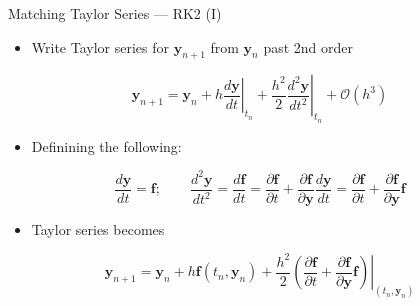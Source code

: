 \documentclass[serif]{beamer}
\begin{document}
\begin{frame}{Matching Taylor Series --- RK2 (I)}
  \begin{itemize}
  \item<1-> Write Taylor series for $\mathbf{y}_{n+1}$ from $\mathbf{y}_n$ past 2nd order
  \end{itemize}
  \begin{equation}
    \nonumber
    \mathbf{y}_{n+1} = \mathbf{y}_n + h\left.\frac{d\mathbf{y}}{dt}\right|_{t_n} + \frac{h^2}{2}\left.\frac{d^2\mathbf{y}}{dt^2}\right|_{t_n} + \mathcal{O}\left(h^3\right)
  \end{equation}
  \begin{itemize}
  \item<1-> Definining the following:
  \end{itemize}
  \begin{equation}
    \nonumber
    \frac{d\mathbf{y}}{dt} = \mathbf{f};\qquad
    \frac{d^2\mathbf{y}}{dt^2} = \frac{d\mathbf{f}}{dt} = \frac{\partial\mathbf{f}}{\partial t} +  \frac{\partial\mathbf{f}}{\partial \mathbf{y}} \frac{d\mathbf{y}}{d t} = \frac{\partial\mathbf{f}}{\partial t} +  \frac{\partial\mathbf{f}}{\partial \mathbf{y}} \mathbf{f}
  \end{equation}
  \begin{itemize}
  \item<1-> Taylor series becomes
  \end{itemize}
  \begin{equation}
    \nonumber
    \mathbf{y}_{n+1} = \mathbf{y}_n + h\mathbf{f}\left(t_n,\mathbf{y}_n\right) + \frac{h^2}{2}\left.\left(\frac{\partial\mathbf{f}}{\partial t} +  \frac{\partial\mathbf{f}}{\partial \mathbf{y}} \mathbf{f}\right)\right|_{\left(t_n,\mathbf{y}_n\right)}
  \end{equation}
\end{frame}
\end{document}
